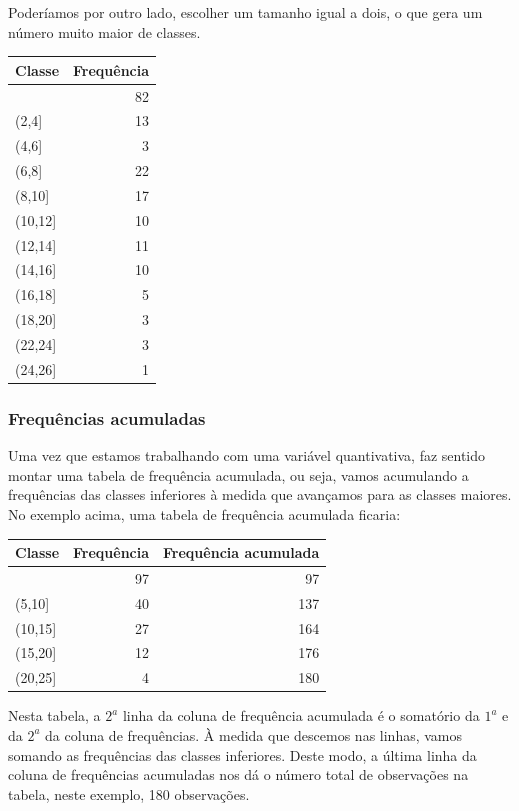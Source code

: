 \documentclass[
]{book}
\begin{document}
Poderíamos por outro lado, escolher um tamanho igual a dois, o que gera um número muito maior de classes.

\begin{tabular}{l|r}
\hline
Classe & Frequência\\
\hline
[0,2] & 82\\
\hline
(2,4] & 13\\
\hline
(4,6] & 3\\
\hline
(6,8] & 22\\
\hline
(8,10] & 17\\
\hline
(10,12] & 10\\
\hline
(12,14] & 11\\
\hline
(14,16] & 10\\
\hline
(16,18] & 5\\
\hline
(18,20] & 3\\
\hline
(22,24] & 3\\
\hline
(24,26] & 1\\
\hline
\end{tabular}

\hypertarget{frequuxeancias-acumuladas}{%
\subsubsection{Frequências acumuladas}\label{frequuxeancias-acumuladas}}

Uma vez que estamos trabalhando com uma variável quantivativa, faz sentido montar uma tabela de frequência acumulada, ou seja, vamos acumulando a frequências das classes inferiores à medida que avançamos para as classes maiores. No exemplo acima, uma tabela de frequência acumulada ficaria:

\begin{tabular}{l|r|r}
\hline
Classe & Frequência & Frequência acumulada\\
\hline
[0,5] & 97 & 97\\
\hline
(5,10] & 40 & 137\\
\hline
(10,15] & 27 & 164\\
\hline
(15,20] & 12 & 176\\
\hline
(20,25] & 4 & 180\\
\hline
\end{tabular}

Nesta tabela, a \(2^a\) linha da coluna de frequência acumulada é o somatório da \(1^a\) e da \(2^a\) da coluna de frequências. À medida que descemos nas linhas, vamos somando as frequências das classes inferiores. Deste modo, a última linha da coluna de frequências acumuladas nos dá o número total de observações na tabela, neste exemplo, 180 observações.
\end{document}
